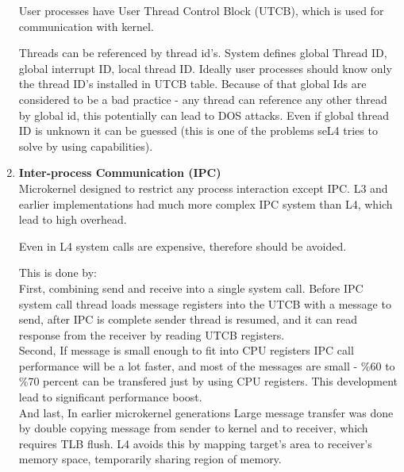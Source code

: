 \documentclass{article}
\begin{document}
\begin{enumerate}[1., leftmargin = 0.4cm, nosep]
                User processes have User Thread Control Block (UTCB), which is used for communication
                with kernel.

                Threads can be referenced by thread id's. System defines global Thread ID,
                global interrupt ID, local thread ID. Ideally user processes should know only
                the thread ID's installed in UTCB table.
                Because of that global Ids are considered to be a bad practice - any thread
                can reference any other thread by global id, this potentially can lead to
                DOS attacks. Even if global thread ID is unknown it can be guessed (this is one
                of the problems seL4 tries to solve by using capabilities). \\


            \item \textbf{Inter-process Communication (IPC)} \\
                Microkernel designed to restrict any process interaction except IPC.
                L3 and earlier implementations had much more complex IPC system than L4,
                which lead to high overhead.

                Even in L4 system calls are expensive, therefore should be avoided. 

                This is done by: \\
                
                First, combining send and receive into a single system call.
                Before IPC system call thread loads message registers into the UTCB with a
                message to send, after IPC is complete sender thread is resumed, and it can
                read response from the receiver by reading UTCB registers.\\

                Second, If message is small enough to fit into CPU
                registers IPC call performance will be a lot faster, and most of the messages are small
                - \%60 to \%70 percent can be transfered just by using CPU registers. This
                  development lead to significant performance boost.\\

                And last, In earlier microkernel generations Large message transfer was done by
                double copying message from sender to kernel and to receiver, which requires
                TLB flush. L4 avoids this by mapping target's area to receiver's memory space, 
                temporarily sharing region of memory.
        \end{enumerate}

\end{document}
